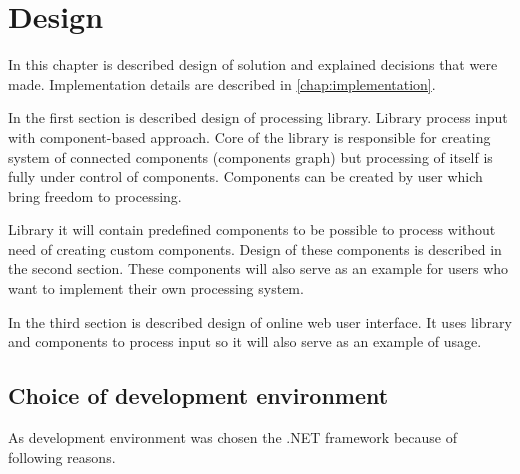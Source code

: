 
\chapter{Design}

In this chapter is described design of solution and explained decisions that were made.
Implementation details are described in \autoref{chap:implementation}.

In the first section is described design of \lsystem processing library.
Library process input with component-based approach.
Core of the library is responsible for creating system of connected components (components graph) but processing of \lsystem itself is fully under control of components.
Components can be created by user which bring freedom to \lsystem processing.

Library it will contain predefined components to be possible to process \lsystems without need of creating custom components.
Design of these components is described in the second section.
These components will also serve as an example for users who want to implement their own processing system.

In the third section is described design of online web user interface.
It uses library and components to process input so it will also serve as an example of usage.


\section{Choice of development environment}

As development environment was chosen the .NET framework because of following reasons.


